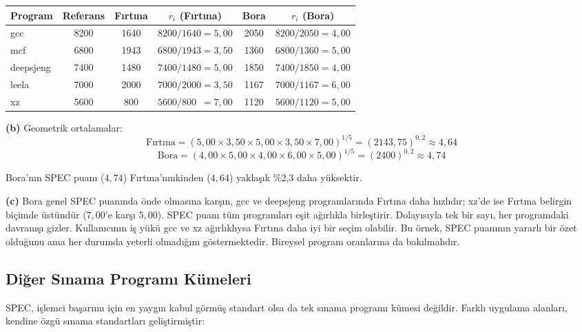 \begin{ornek}[2.9]
\begin{center}
\small
\begin{tabular}{lccccc}
\toprule
\textbf{Program} & \textbf{Referans} & \textbf{Fırtına} & $r_i$ \textbf{(Fırtına)} & \textbf{Bora} & $r_i$ \textbf{(Bora)} \\
\midrule
gcc         & 8200 & 1640 & $8200/1640 = 5{,}00$ & 2050 & $8200/2050 = 4{,}00$ \\
mcf         & 6800 & 1943 & $6800/1943 = 3{,}50$ & 1360 & $6800/1360 = 5{,}00$ \\
deepsjeng   & 7400 & 1480 & $7400/1480 = 5{,}00$ & 1850 & $7400/1850 = 4{,}00$ \\
leela       & 7000 & 2000 & $7000/2000 = 3{,}50$ & 1167 & $7000/1167 = 6{,}00$ \\
xz          & 5600 & 800  & $5600/800\;\: = 7{,}00$ & 1120 & $5600/1120 = 5{,}00$ \\
\bottomrule
\end{tabular}
\end{center}

\textbf{(b)} Geometrik ortalamalar:
\[
\text{Fırtına} = (5{,}00 \times 3{,}50 \times 5{,}00 \times 3{,}50 \times 7{,}00)^{1/5} = (2143{,}75)^{0{,}2} \approx 4{,}64
\]
\[
\text{Bora} = (4{,}00 \times 5{,}00 \times 4{,}00 \times 6{,}00 \times 5{,}00)^{1/5} = (2400)^{0{,}2} \approx 4{,}74
\]

Bora'nın SPEC puanı ($4{,}74$) Fırtına'nınkinden ($4{,}64$) yaklaşık \%2,3 daha yüksektir.

\textbf{(c)} Bora genel SPEC puanında önde olmasına karşın, gcc ve deepsjeng programlarında Fırtına daha hızlıdır; xz'de ise Fırtına belirgin biçimde üstündür ($7{,}00$'e karşı $5{,}00$). SPEC puanı tüm programları eşit ağırlıkla birleştirir. Dolayısıyla tek bir sayı, her programdaki davranışı gizler. Kullanıcının iş yükü gcc ve xz ağırlıklıysa Fırtına daha iyi bir seçim olabilir. Bu örnek, SPEC puanının yararlı bir özet olduğunu ama her durumda yeterli olmadığını göstermektedir. Bireysel program oranlarına da bakılmalıdır.
\end{ornek}

\subsection{Diğer Sınama Programı Kümeleri}
\label{subsec:diger-sinama}

SPEC, işlemci başarımı için en yaygın kabul görmüş standart olsa da tek sınama programı kümesi değildir. Farklı uygulama alanları, kendine özgü sınama standartları geliştirmiştir:

